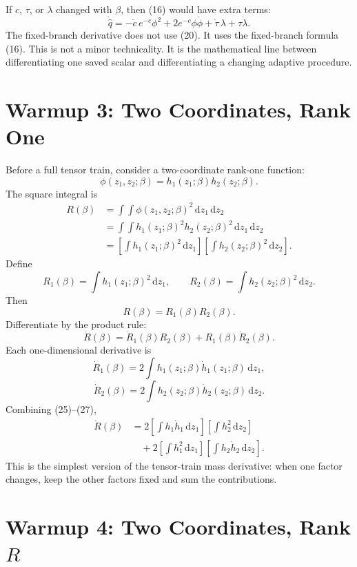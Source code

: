 \documentclass[11pt]{article}
\theoremstyle{remark}
\newcommand{\dd}{\,\mathrm d}
\begin{document}
If \(c\), \(\tau\), or \(\lambda\) changed with \(\beta\), then (16) would have
extra terms:
\[
    \dot{\widehat q}
    =
    -\dot c\,e^{-c}\phi^2
    +
    2e^{-c}\phi\dot\phi
    +
    \dot\tau\,\lambda
    +
    \tau\dot\lambda.
    \tag{20}
\]
The fixed-branch derivative does not use (20).  It uses the fixed-branch
formula (16).  This is not a minor technicality.  It is the mathematical line
between differentiating one saved scalar and differentiating a changing
adaptive procedure.

\section{Warmup 3: Two Coordinates, Rank One}

Before a full tensor train, consider a two-coordinate rank-one function:
\[
    \phi(z_1,z_2;\beta)=h_1(z_1;\beta)h_2(z_2;\beta).
    \tag{21}
\]
The square integral is
\[
\begin{aligned}
    R(\beta)
    &=
    \int\!\!\int
    \phi(z_1,z_2;\beta)^2\dd z_1\dd z_2\\
    &=
    \int\!\!\int
    h_1(z_1;\beta)^2h_2(z_2;\beta)^2\dd z_1\dd z_2\\
    &=
    \left[\int h_1(z_1;\beta)^2\dd z_1\right]
    \left[\int h_2(z_2;\beta)^2\dd z_2\right].
\end{aligned}
\tag{22}
\]
Define
\[
    R_1(\beta)=\int h_1(z_1;\beta)^2\dd z_1,
    \qquad
    R_2(\beta)=\int h_2(z_2;\beta)^2\dd z_2.
    \tag{23}
\]
Then
\[
    R(\beta)=R_1(\beta)R_2(\beta).
    \tag{24}
\]
Differentiate by the product rule:
\[
    \dot R(\beta)=\dot R_1(\beta)R_2(\beta)+R_1(\beta)\dot R_2(\beta).
    \tag{25}
\]
Each one-dimensional derivative is
\[
    \dot R_1(\beta)=2\int h_1(z_1;\beta)\dot h_1(z_1;\beta)\dd z_1,
    \tag{26}
\]
\[
    \dot R_2(\beta)=2\int h_2(z_2;\beta)\dot h_2(z_2;\beta)\dd z_2.
    \tag{27}
\]
Combining (25)--(27),
\[
\begin{aligned}
    \dot R(\beta)
    &=
    2
    \left[\int h_1\dot h_1\dd z_1\right]
    \left[\int h_2^2\dd z_2\right]\\
    &\quad+
    2
    \left[\int h_1^2\dd z_1\right]
    \left[\int h_2\dot h_2\dd z_2\right].
\end{aligned}
\tag{28}
\]
This is the simplest version of the tensor-train mass derivative: when one
factor changes, keep the other factors fixed and sum the contributions.

\section{Warmup 4: Two Coordinates, Rank \texorpdfstring{\(R\)}{R}}
\end{document}
